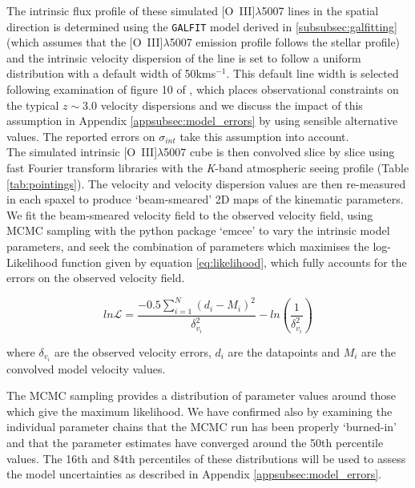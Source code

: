\documentclass[fleqn,usenatbib]{mn2e}
\newcommand{\Lagr}{\mathcal{L}}
\begin{document}
The intrinsic flux profile of these simulated [O~{\sc III}]$\lambda$5007 lines in the spatial direction is determined using the {\tt GALFIT} model derived in \cref{subsubsec:galfitting} (which assumes that the [O~{\sc III}]$\lambda$5007 emission profile follows the stellar profile) and the intrinsic velocity dispersion of the line is set to follow a uniform distribution with a default width of 50kms$^{-1}$.
This default line width is selected following examination of figure 10 of \cite{Wisnioski2015}, which places observational constraints on the typical $z\sim3.0$ velocity dispersions and we discuss the impact of this assumption in Appendix \ref{appsubsec:model_errors} by using sensible alternative values.
The reported errors on $\sigma_{int}$ take this assumption into account. \\

The simulated intrinsic [O~{\sc III}]$\lambda$5007 cube is then convolved slice by slice using fast Fourier transform libraries with the {\it K}-band atmospheric seeing profile (Table \ref{tab:pointings}).
The velocity and velocity dispersion values are then re-measured in each spaxel to produce `beam-smeared' 2D maps of the kinematic parameters.
We fit the beam-smeared velocity field to the observed velocity field, using MCMC sampling with the python package `emcee' \citep{Foreman-Mackey2013} to vary the intrinsic model parameters, and seek the combination of parameters which maximises the log-Likelihood function given by equation \ref{eq:likelihood}, which fully accounts for the errors on the observed velocity field.

\begin{equation}\label{eq:likelihood}
   ln\Lagr = \frac{-0.5\sum_{i=1}^{N}(d_{i} - M_{i})^{2}}{\delta_{v_{i}}^{2}} - ln\left(\frac{1}{\delta_{v_{i}}^{2}}\right)
\end{equation}

\noindent
where $\delta_{v_{i}}$ are the observed velocity errors, $d_{i}$ are the datapoints and $M_{i}$ are the convolved model velocity values.

The MCMC sampling provides a distribution of parameter values around those which give the maximum likelihood.
We have confirmed also by examining the individual parameter chains that the MCMC run has been properly `burned-in' and that the parameter estimates have converged around the 50th percentile values.
The 16th and 84th percentiles of these distributions will be used to assess the model uncertainties as described in Appendix \ref{appsubsec:model_errors}.
\end{document}
